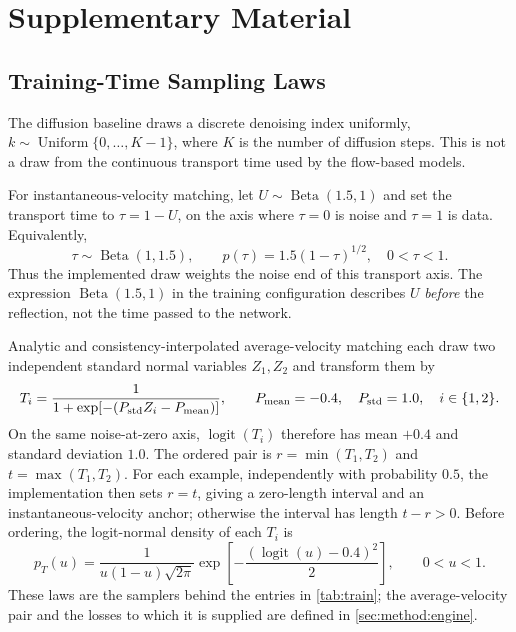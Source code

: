 \appendix{}

\chapter{Supplementary Material}\label{app:derivations}\label{app:supplementary}

\section{Training-Time Sampling Laws}\label{app:training-time-laws}

The diffusion baseline draws a discrete denoising index uniformly,
$k\sim\operatorname{Uniform}\{0,\ldots,K-1\}$, where $K$ is the number of diffusion steps. This is not
a draw from the continuous transport time used by the flow-based models.

For instantaneous-velocity matching, let $U\sim\operatorname{Beta}(1.5,1)$ and set the transport
time to $\tau=1-U$, on the axis where $\tau=0$ is noise and $\tau=1$ is data. Equivalently,
\begin{equation}
  \tau\sim\operatorname{Beta}(1,1.5),\qquad
  p(\tau)=1.5(1-\tau)^{1/2},\quad 0<\tau<1.
\end{equation}
Thus the implemented draw weights the noise end of this transport axis. The expression
$\operatorname{Beta}(1.5,1)$ in the training configuration describes $U$ \emph{before} the reflection,
not the time passed to the network.

Analytic and consistency-interpolated average-velocity matching each draw two independent standard
normal variables $Z_1,Z_2$ and transform them by
\begin{equation}
  T_i=\frac{1}{1+\exp[-(P_{\textrm{std}}Z_i-P_{\textrm{mean}})]},\qquad
  P_{\textrm{mean}}=-0.4,\quad P_{\textrm{std}}=1.0,\quad i\in\{1,2\}.
\end{equation}
On the same noise-at-zero axis, $\operatorname{logit}(T_i)$ therefore has mean $+0.4$ and standard
deviation $1.0$. The ordered pair is $r=\min(T_1,T_2)$ and $t=\max(T_1,T_2)$. For each example,
independently with probability $0.5$, the implementation then sets $r=t$, giving a zero-length interval and an
instantaneous-velocity anchor; otherwise the interval has length $t-r>0$. Before ordering, the
logit-normal density of each $T_i$ is
\begin{equation}
  p_T(u)=\frac{1}{u(1-u)\sqrt{2\pi}}
  \exp\!\left[-\frac{(\operatorname{logit}(u)-0.4)^2}{2}\right],\qquad 0<u<1.
\end{equation}
These laws are the samplers behind the entries in \autoref{tab:train}; the average-velocity pair and
the losses to which it is supplied are defined in \autoref{sec:method:engine}.

